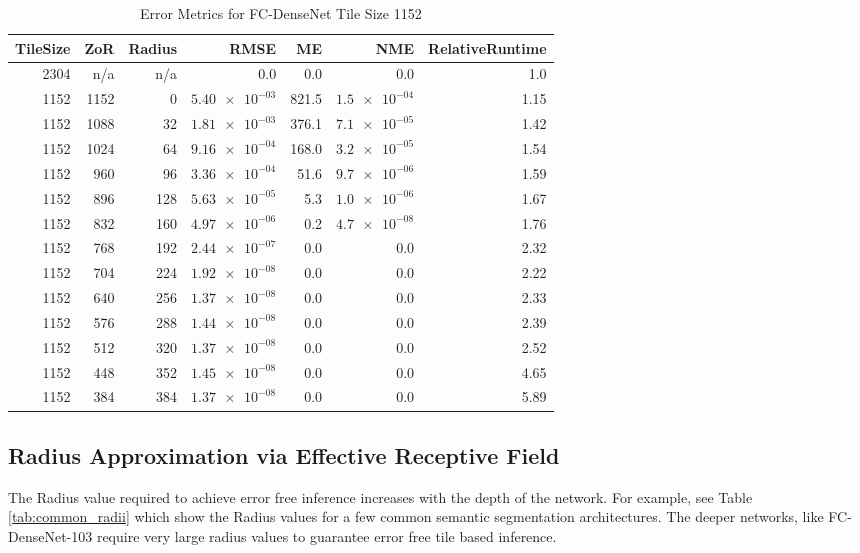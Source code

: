 \documentclass[runningheads]{llncs}
\begin{document}
\begin{table}[h!]
	\centering
	\caption{Error Metrics for FC-DenseNet Tile Size 1152}
	\label{tab:tile_size_1152}
	\begin{tabular}{r|r|r|r|r|r|r}
		TileSize & ZoR & Radius & RMSE    & ME & NME & RelativeRuntime \\ 
		\hline
2304 & n/a & n/a & 0.0 & 0.0 & 0.0 & 1.0 \\
1152 & 1152 & 0 & $\num{5.40e-03}$ & 821.5 & $\num{1.5e-04}$ & 1.15 \\
1152 & 1088 & 32 & $\num{1.81e-03}$ & 376.1 & $\num{7.1e-05}$ & 1.42 \\
1152 & 1024 & 64 & $\num{9.16e-04}$ & 168.0 & $\num{3.2e-05}$ & 1.54 \\
1152 & 960 & 96 & $\num{3.36e-04}$ & 51.6 & $\num{9.7e-06}$ & 1.59 \\
1152 & 896 & 128 & $\num{5.63e-05}$ & 5.3 & $\num{1.0e-06}$ & 1.67 \\
1152 & 832 & 160 & $\num{4.97e-06}$ & 0.2 & $\num{4.7e-08}$ & 1.76 \\
1152 & 768 & 192 & $\num{2.44e-07}$ & 0.0 & 0.0 & 2.32 \\
1152 & 704 & 224 & $\num{1.92e-08}$ & 0.0 & 0.0 & 2.22 \\
1152 & 640 & 256 & $\num{1.37e-08}$ & 0.0 & 0.0 & 2.33 \\
1152 & 576 & 288 & $\num{1.44e-08}$ & 0.0 & 0.0 & 2.39 \\
1152 & 512 & 320 & $\num{1.37e-08}$ & 0.0 & 0.0 & 2.52 \\
1152 & 448 & 352 & $\num{1.45e-08}$ & 0.0 & 0.0 & 4.65 \\
1152 & 384 & 384 & $\num{1.37e-08}$ & 0.0 & 0.0 & 5.89 \\
	\end{tabular}
\end{table}


\subsection{Radius Approximation via Effective Receptive Field}

The Radius value required to achieve error free inference increases with the depth of the network. For example, see Table \ref{tab:common_radii} which show the Radius values for a few common semantic segmentation architectures. The deeper networks, like FC-DenseNet-103 require very large radius values to guarantee error free tile based inference.
\end{document}
